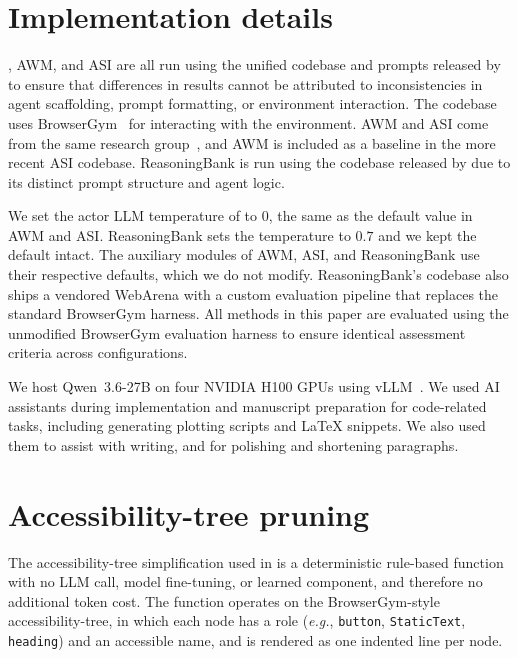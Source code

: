 \section{Implementation details}
\label{app:implementation}

\budgetactor{}, AWM, and ASI are all run using the unified codebase and prompts released by \citet{wang-etal-2025-asi} to ensure that differences in results cannot be attributed to inconsistencies in agent scaffolding, prompt formatting, or environment interaction.
The codebase uses BrowserGym~\citep{chezelles-etal-2025-browsergym} for interacting with the environment.
AWM and ASI come from the same research group~\citep{wang-etal-2024-agent, wang-etal-2025-asi}, and AWM is included as a baseline in the more recent ASI codebase.
ReasoningBank is run using the codebase released by \citet{ouyang-etal-2025-reasoningbank} due to its distinct prompt structure and agent logic.

We set the actor LLM temperature of \budgetactor{} to $0$, the same as the default value in AWM and ASI.
ReasoningBank sets the temperature to $0.7$ and we kept the default intact.
The auxiliary modules of AWM, ASI, and ReasoningBank use their respective defaults, which we do not modify.
ReasoningBank's codebase also ships a vendored WebArena with a custom evaluation pipeline that replaces the standard BrowserGym harness.
All methods in this paper are evaluated using the unmodified BrowserGym evaluation harness to ensure identical assessment criteria across configurations.

We host Qwen~3.6-27B on four NVIDIA H100 GPUs using vLLM~\citep{kwon-etal-2023-vllm}. 
We used AI assistants during implementation and manuscript preparation for code-related tasks, including generating plotting scripts and LaTeX snippets.
We also used them to assist with writing, and for polishing and shortening paragraphs.


\section{Accessibility-tree pruning}
\label{app:pruning}

The accessibility-tree simplification used in \budgetactor{} is a deterministic rule-based function with no LLM call, model fine-tuning, or learned component, and therefore no additional token cost.
The function operates on the BrowserGym-style accessibility-tree, in which each node has a role (\textit{e.g.}, \texttt{button}, \texttt{StaticText}, \texttt{heading}) and an accessible name, and is rendered as one indented line per node.

